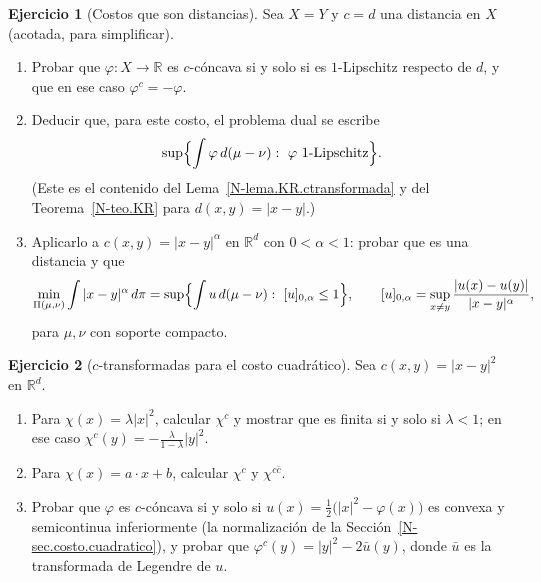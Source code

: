 \documentclass[11pt,a4paper]{amsart}
\newcounter{chapter}
\newcommand{\R}{{\mathbb R}}
\theoremstyle{remark}
\theoremstyle{definition}
\newtheorem{ejercicio}{Ejercicio}[chapter]
\numberwithin{subsection}{section}
\numberwithin{equation}{section}
\begin{document}
\begin{ejercicio}[Costos que son distancias]\label{ejer.ctransf.distancia}
Sea $X=Y$ y $c=d$ una distancia en $X$ (acotada, para simplificar).
\begin{enumerate}[label=(\alph*)]
\item Probar que $\varphi\colon X\to\R$ es $c$-cóncava si y solo si es
$1$-Lipschitz respecto de $d$, y que en ese caso $\varphi^c=-\varphi$.
\item Deducir que, para este costo, el problema dual se escribe
\[
\sup\Bigl\{\int\varphi\,d(\mu-\nu):\ \varphi\ \text{$1$-Lipschitz}\Bigr\}.
\]
(Este es el contenido del Lema~\ref{N-lema.KR.ctransformada} y del
Teorema~\ref{N-teo.KR} para $d(x,y)=|x-y|$.)
\item Aplicarlo a $c(x,y)=|x-y|^\alpha$ en $\R^d$ con $0<\alpha<1$: probar
que es una distancia y que
\[
\min_{\Pi(\mu,\nu)}\int|x-y|^\alpha\,d\pi
=\sup\Bigl\{\int u\,d(\mu-\nu):\ [u]_{0,\alpha}\le1\Bigr\},
\qquad
[u]_{0,\alpha}=\sup_{x\ne y}\frac{|u(x)-u(y)|}{|x-y|^\alpha},
\]
para $\mu,\nu$ con soporte compacto.
\end{enumerate}
\end{ejercicio}

\begin{ejercicio}[$c$-transformadas para el costo cuadrático]\label{ejer.ctransf.cuadratico}
Sea $c(x,y)=|x-y|^2$ en $\R^d$.
\begin{enumerate}[label=(\alph*)]
\item Para $\chi(x)=\lambda|x|^2$, calcular $\chi^c$ y mostrar que es finita
si y solo si $\lambda<1$; en ese caso $\chi^c(y)=-\frac{\lambda}{1-\lambda}|y|^2$.
\item Para $\chi(x)=a\cdot x+b$, calcular $\chi^c$ y $\chi^{c\bar c}$.
\item Probar que $\varphi$ es $c$-cóncava si y solo si
$u(x)=\frac12\bigl(|x|^2-\varphi(x)\bigr)$ es convexa y semicontinua
inferiormente (la normalización de la Sección~\ref{N-sec.costo.cuadratico}), y
probar que $\varphi^c(y)=|y|^2-2\bar u(y)$, donde $\bar u$ es la
transformada de Legendre de $u$.
\end{enumerate}
\end{ejercicio}
\end{document}
